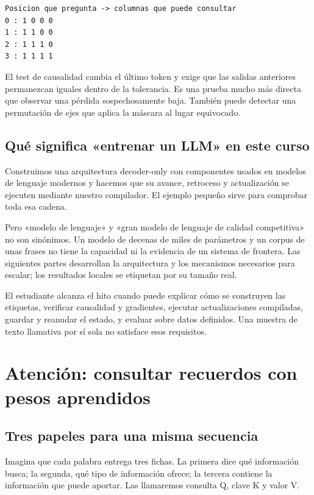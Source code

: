 \documentclass[12pt,a4paper,oneside]{report}
\begin{document}
\begin{lstlisting}
Posicion que pregunta -> columnas que puede consultar
0 : 1 0 0 0
1 : 1 1 0 0
2 : 1 1 1 0
3 : 1 1 1 1
\end{lstlisting}
El test de causalidad cambia el último token y exige que las salidas anteriores permanezcan iguales dentro de la tolerancia. Es una prueba mucho más directa que observar una pérdida sospechosamente baja. También puede detectar una permutación de ejes que aplica la máscara al lugar equivocado.

\section{Qué significa «entrenar un LLM» en este curso}
Construimos una arquitectura decoder-only con componentes usados en modelos de lenguaje modernos y hacemos que su avance, retroceso y actualización se ejecuten mediante nuestro compilador. El ejemplo pequeño sirve para comprobar toda esa cadena.

Pero «modelo de lenguaje» y «gran modelo de lenguaje de calidad competitiva» no son sinónimos. Un modelo de decenas de miles de parámetros y un corpus de unas frases no tiene la capacidad ni la evidencia de un sistema de frontera. Las siguientes partes desarrollan la arquitectura y los mecanismos necesarios para escalar; los resultados locales se etiquetan por su tamaño real.

\begin{comprueba}
El estudiante alcanza el hito cuando puede explicar cómo se construyen las etiquetas, verificar causalidad y gradientes, ejecutar actualizaciones compiladas, guardar y reanudar el estado, y evaluar sobre datos definidos. Una muestra de texto llamativa por sí sola no satisface esos requisitos.

\end{comprueba}
\chapter{Atención: consultar recuerdos con pesos aprendidos}
\label{ch:attention}
\section{Tres papeles para una misma secuencia}
Imagina que cada palabra entrega tres fichas. La primera dice qué información busca; la segunda, qué tipo de información ofrece; la tercera contiene la información que puede aportar. Las llamaremos consulta Q, clave K y valor V.
\end{document}
